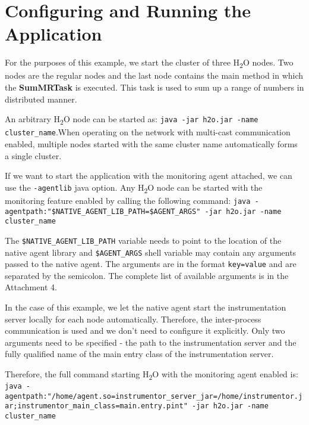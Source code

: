 \section{Configuring and Running the Application}
For the purposes of this example, we start the cluster of three H\textsubscript{2}O nodes. Two nodes are the regular nodes and the last node contains the main method in which the \textbf{SumMRTask} is executed. This task is used to sum up a range of numbers in distributed manner.

An arbitrary H\textsubscript{2}O node can be started as: \newline \texttt{java -jar h2o.jar -name cluster\_name}.\newline When operating on the network with multi-cast communication enabled, multiple nodes started with the same cluster name automatically forms a single cluster.

If we want to start the application with the monitoring agent attached, we can use the \texttt{-agentlib} java option. Any H\textsubscript{2}O node can be started with the monitoring feature enabled by calling the following command: \newline
\texttt{java -agentpath:"\$NATIVE\_AGENT\_LIB\_PATH=\$AGENT\_ARGS" -jar h2o.jar  \newline -name cluster\_name}

The \texttt{\$NATIVE\_AGENT\_LIB\_PATH} variable needs to point to the location of the native agent library and \texttt{\$AGENT\_ARGS} shell variable may contain any arguments passed to the native agent. The arguments are in the format \texttt{key=value} and are separated by the semicolon. The complete list of available arguments is in the Attachment 4.

In the case of this example, we let the native agent start the instrumentation server locally for each node automatically. Therefore, the inter-process communication is used and we don't need to configure it explicitly. Only two arguments need to be specified - the path to the instrumentation server and the fully qualified name of the main entry class of the instrumentation server.

Therefore, the full command starting H\textsubscript{2}O with the monitoring agent enabled is: \newline
\texttt{java -agentpath:"/home/agent.so=instrumentor\_server\_jar=\newline/home/instrumentor.jar;instrumentor\_main\_class=main.entry.pint" \newline-jar h2o.jar -name cluster\_name}


